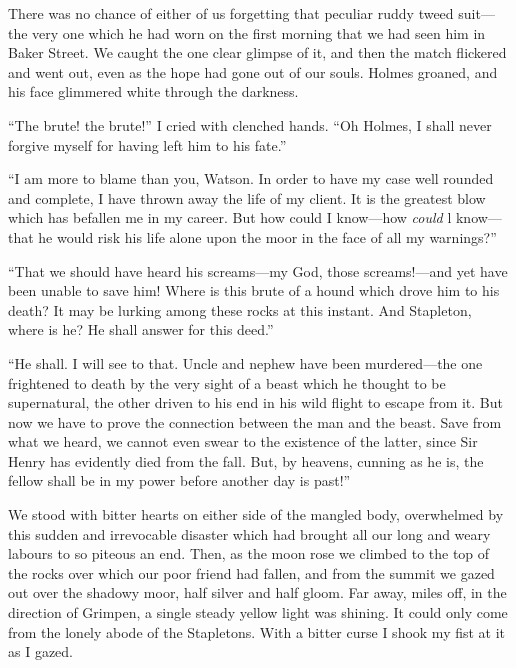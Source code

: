 \documentclass[paper=5.5in:8.5in,BCOR=7mm,twoside,DIV=calc,12pt,usegeometry,openany,chapterprefix,endperiod]{scrbook} %
\begin{document}


There was no chance of either of us forgetting that peculiar ruddy tweed suit\nobreakdash---the very one which he had worn on the first morning that we had seen him in Baker Street. We caught the one clear glimpse of it, and then the match flickered and went out, even as the hope had gone out of our souls. Holmes groaned, and his face glimmered white through the darkness.

\enquote{The brute! the brute!} I cried with clenched hands. \enquote{Oh Holmes, I shall never forgive myself for having left him to his fate.}

\enquote{I am more to blame than you, Watson. In order to have my case well rounded and complete, I have thrown away the life of my client. It is the greatest blow which has befallen me in my career. But how could I know\nobreakdash---how \emph{could} l know\nobreakdash---that he would risk his life alone upon the moor in the face of all my warnings?}

\enquote{That we should have heard his screams\nobreakdash---my God, those \newline screams!\nobreakdash---and yet have been unable to save him! Where is this brute of a hound which drove him to his death? It may be lurking among these rocks at this instant. And Stapleton, where is he? He shall answer for this deed.}

\enquote{He shall. I will see to that. Uncle and nephew have been murdered\nobreakdash---the one frightened to death by the very sight of a beast which he thought to be supernatural, the other driven to his end in his wild flight to escape from it. But now we have to prove the connection between the man and the beast. Save from what we heard, we cannot even swear to the existence of the latter, since Sir Henry has evidently died from the fall. But, by heavens, cunning as he is, the fellow shall be in my power before another day is past!}

We stood with bitter hearts on either side of the mangled body, overwhelmed by this sudden and irrevocable disaster which had brought all our long and weary labours to so piteous an end. Then, as the moon rose we climbed to the top of the rocks over which our poor friend had fallen, and from the summit we gazed out over the shadowy moor, half silver and half gloom. Far away, miles off, in the direction of Grimpen, a single steady yellow light was shining. It could only come from the lonely abode of the Stapletons. With a bitter curse I shook my fist at it as I gazed.
\end{document}
